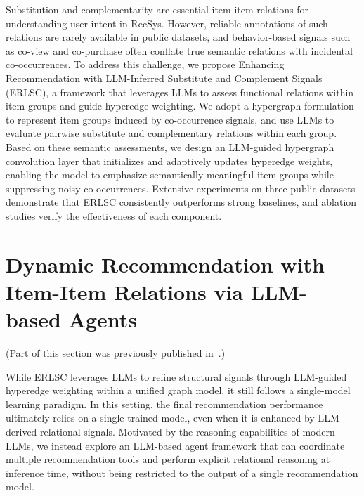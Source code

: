 Substitution and complementarity are essential item-item relations for understanding user intent in RecSys. However, reliable annotations of such relations are rarely available in public datasets, and behavior-based signals such as co-view and co-purchase often conflate true semantic relations with incidental co-occurrences. To address this challenge, we propose Enhancing Recommendation with LLM-Inferred Substitute and Complement Signals (ERLSC), a framework that leverages LLMs to assess functional relations within item groups and guide hyperedge weighting. We adopt a hypergraph formulation to represent item groups induced by co-occurrence signals, and use LLMs to evaluate pairwise substitute and complementary relations within each group. Based on these semantic assessments, we design an LLM-guided hypergraph convolution layer that initializes and adaptively updates hyperedge weights, enabling the model to emphasize semantically meaningful item groups while suppressing noisy co-occurrences. Extensive experiments on three public datasets demonstrate that ERLSC consistently outperforms strong baselines, and ablation studies verify the effectiveness of each component.

\section{Dynamic Recommendation with Item-Item Relations via LLM-based Agents}
(Part of this section was previously published in~\cite{agentdr}.)

While ERLSC leverages LLMs to refine structural signals through LLM-guided hyperedge weighting within a unified graph model, it still follows a single-model learning paradigm. In this setting, the final recommendation performance ultimately relies on a single trained model, even when it is enhanced by LLM-derived relational signals. Motivated by the reasoning capabilities of modern LLMs, we instead explore an LLM-based agent framework that can coordinate multiple recommendation tools and perform explicit relational reasoning at inference time, without being restricted to the output of a single recommendation model.

